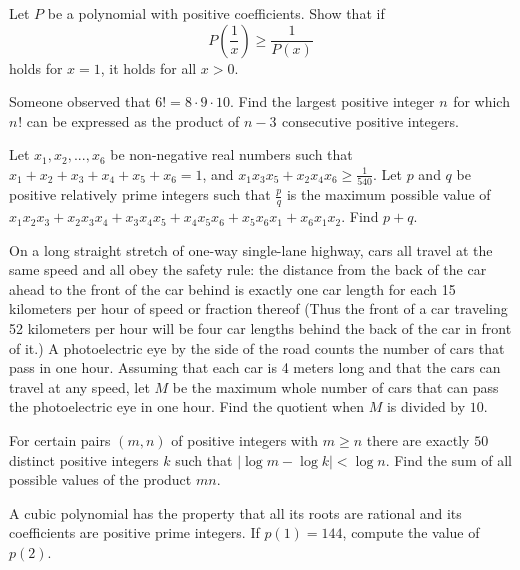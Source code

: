 \documentclass[blue,onecol]{shooting}
\begin{document}
\begin{prob}[Andreescu]{4}
Let $P$ be a polynomial with positive coefficients. Show that if \[P\left(\frac1x\right)\ge \frac1{P(x)}\] holds for $x=1$, it holds for all $x>0$. 
\end{prob} 

\begin{req}[AIME 1990/11]{6}
Someone observed that $6! = 8 \cdot 9 \cdot 10$. Find the largest positive integer $n^{}_{}$ for which $n^{}_{}!$ can be expressed as the product of $n - 3_{}^{}$ consecutive positive integers.
\end{req} 

\begin{prob}[AIME II 2011/9]{6}
Let $x_1, x_2, ... , x_6$ be non-negative real numbers such that $x_1 +x_2 +x_3 +x_4 +x_5 +x_6 =1$, and $x_1 x_3 x_5 +x_2 x_4 x_6 \ge {\scriptstyle\frac{1}{540}}$. Let $p$ and $q$ be positive relatively prime integers such that $\frac{p}{q}$ is the maximum possible value of $x_1 x_2 x_3 + x_2 x_3 x_4 +x_3 x_4 x_5 +x_4 x_5 x_6 +x_5 x_6 x_1 +x_6 x_1 x_2$. Find $p+q$.
\end{prob} 

\begin{req}[AIME I 2008/12]{6}
On a long straight stretch of one-way single-lane highway, cars all travel at the same speed and all obey the safety rule: the distance from the back of the car ahead to the front of the car behind is exactly one car length for each 15 kilometers per hour of speed or fraction thereof (Thus the front of a car traveling 52 kilometers per hour will be four car lengths behind the back of the car in front of it.) A photoelectric eye by the side of the road counts the number of cars that pass in one hour. Assuming that each car is 4 meters long and that the cars can travel at any speed, let $M$ be the maximum whole number of cars that can pass the photoelectric eye in one hour. Find the quotient when $M$ is divided by $10$.
\end{req} 

\begin{prob}[AIME II 2009/11]{9}
For certain pairs $(m,n)$ of positive integers with $m\geq n$ there are exactly $50$ distinct positive integers $k$ such that $|\log m - \log k| < \log n$. Find the sum of all possible values of the product $mn$.
\end{prob} 

\begin{prob}[]{9}
A cubic polynomial has the property that all its roots are rational and its coefficients are positive prime integers. If $p(1)=144$, compute the value of $p(2)$. 
\end{prob} 
\end{document}
